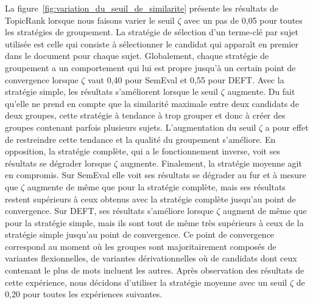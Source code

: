     La figure~\ref{fig:variation_du_seuil_de_similarite} présente les résultats
    de TopicRank lorsque nous faisons varier le seuil $\zeta$ avec un pas de
    0,05 pour toutes les stratégies de groupement. La stratégie de sélection
    d'un terme-clé par sujet utilisée est celle qui consiste à sélectionner le
    candidat qui apparaît en premier dans le document pour chaque sujet.
    Globalement, chaque stratégie de groupement a un comportement qui lui est
    propre jusqu'à un certain point de convergence lorsque $\zeta$ vaut 0,40
    pour SemEval et 0,55 pour DEFT.
    Avec la stratégie simple, les résultats s'améliorent lorsque le seuil
    $\zeta$ augmente. Du fait qu'elle ne prend en compte que la similarité
    maximale entre deux candidats de deux groupes, cette stratégie à tendance à
    trop grouper et donc à créer des groupes contenant parfois plusieurs sujets.
    L'augmentation du seuil $\zeta$ a pour effet de restreindre cette tendance
    et la qualité du groupement s'améliore. En opposition, la stratégie
    complète, qui a le fonctionnement inverse, voit ses résultats se dégrader
    lorsque $\zeta$ augmente. Finalement, la stratégie moyenne agit en
    compromis. Sur SemEval elle voit ses résultats se dégrader au fur et à
    mesure que $\zeta$ augmente de même que pour la stratégie complète, mais ses
    résultats restent supérieurs à ceux obtenus avec la stratégie complète
    jusqu'au point de convergence. Sur DEFT, ses résultats s'améliore lorsque
    $\zeta$ augment de même que pour la stratégie simple, mais ils sont tout de
    même très supérieurs à ceux de la stratégie simple jusqu'au point de
    convergence. Ce point de convergence correspond au moment où les groupes
    sont majoritairement composés de variantes flexionnelles, de variantes
    dérivationnelles où de candidats dont ceux contenant le plus de mots
    incluent les autres. %
    Après observation des résultats de cette expérience, nous décidons
    d'utiliser la stratégie moyenne avec un seuil $\zeta$ de 0,20 pour toutes
    les expériences suivantes.

